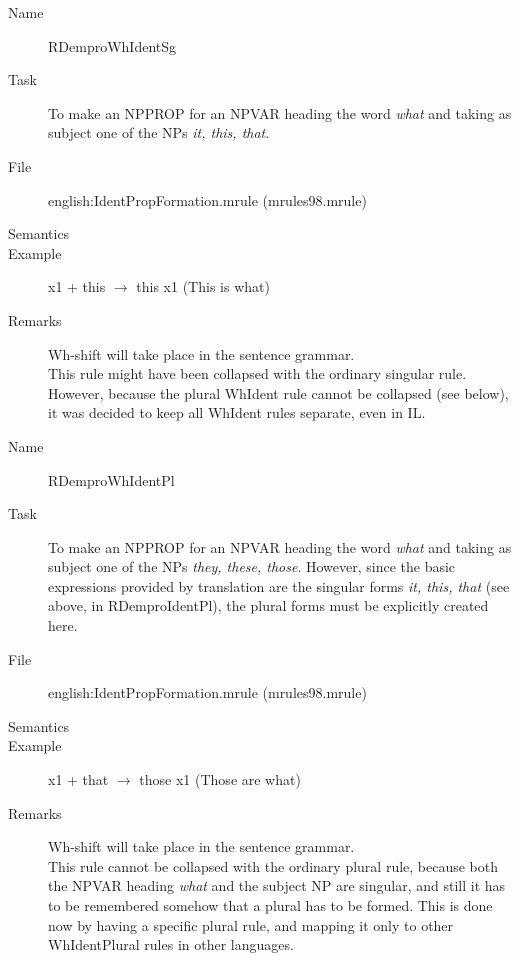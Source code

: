 \begin{description}
\vspace{1 cm}
\begin{description}
\item[Name] RDemproWhIdentSg
\item[Task] To make an NPPROP for an NPVAR heading the word {\em what\/} and 
taking as subject one of the NPs {\em it, this, that\/}. 
\item[File] english:IdentPropFormation.mrule (mrules98.mrule)
\item[Semantics]
\item[Example] x1 + this $\rightarrow$ this x1 (This is what)
\item[Remarks] Wh-shift will take place in the sentence grammar.\\
This rule might have been collapsed with the ordinary singular rule. However, 
because the plural WhIdent rule cannot be collapsed (see below), it was decided 
to keep all WhIdent rules separate, even in IL.
\end{description}

\vspace{1 cm}
\begin{description}
\item[Name] RDemproWhIdentPl
\item[Task] To make an NPPROP for an NPVAR heading the word {\em what\/} and 
taking as subject one of the NPs {\em they, these, those\/}. However, since the 
basic expressions provided by translation are the singular forms {\em it, this, 
that\/} (see above, in RDemproIdentPl), the plural forms must be explicitly 
created here.
\item[File] english:IdentPropFormation.mrule (mrules98.mrule)
\item[Semantics]
\item[Example] x1 + that $\rightarrow$ those x1 (Those are what)
\item[Remarks] Wh-shift will take place in the sentence grammar.\\
This rule cannot be collapsed with the ordinary plural rule, because both the 
NPVAR heading {\em what\/} and the subject NP are singular, and still it has to 
be remembered somehow that a plural has to be formed. This is done now by 
having a specific plural rule, and mapping it only to other WhIdentPlural rules 
in other languages.
\end{description}


\end{description}
